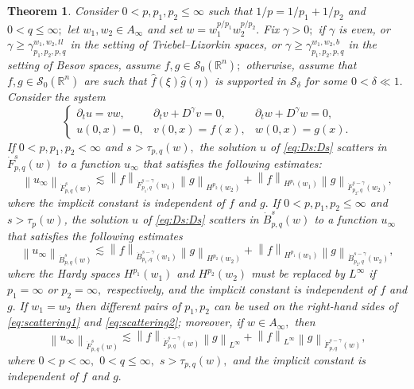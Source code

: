 \documentclass[10pt,a4paper]{article}
\newtheorem{theorem}{Theorem}[section]
\theoremstyle{remark}
\newcommand{\rn}{{{\mathbb R}^n}}
\newcommand{\swz}{{\mathcal{S}_0}(\rn)}
\newcommand{\tlw}[4]{\dot F_{#1,#3}^{#2}(#4)} %
\newcommand{\besw}[4]{\dot B_{#1,#3}^{#2}(#4)} %
\newcommand{\Ss}{\mathcal{S}}
\newcommand{\fhat}{\widehat{f}}
\newcommand{\ghat}{\widehat{g}}
\newcommand{\norm}[2]{\left\|#1\right\|_{#2}}
\newcommand{\hcline}{1/p=1/p_1+1/p_2}
\newcommand{\gamt}{\gamma_{p_1,p_2,p,q}^{w_1,w_2, tl}}
\newcommand{\gamb}{\gamma_{p_1,p_2,p,q}^{w_1,w_2,b}}
\begin{document}
 
 \begin{theorem}\label{thm:scattering} Consider  $0 < p, p_1, p_2  \le \infty$  such that $\hcline$ and  $0 < q \leq \infty;$ let  $w_1,w_2\in A_\infty$ and set $w=w_1^{{p}/{p_1}} w_2^{{p}/{p_2}}.$ 
Fix $\gamma>0;$ if $\gamma$ is even, or $\gamma\ge \gamt$ in the setting of Triebel--Lizorkin spaces, or $\gamma\ge \gamb$ in the setting of Besov spaces, assume $f, g \in \swz;$ otherwise, assume that $f,g\in\swz$ are such that $\fhat(\xi)\ghat(\eta)$ is supported in $\Ss_{\delta}$ for some $0<\delta\ll1.$ Consider the system 
\begin{equation}\label{eq:Ds:Ds}
\left\{ \begin{array}{lll}  \partial_t u =vw, & \partial_t v +D^\gamma v = 0, & \partial_t w + D^\gamma w = 0, \\
  u(0,x)=0,&v(0,x)=f(x),&w(0,x) = g(x).
 \end{array} \right.
\end{equation}
If $0 < p,p_1,p_2 < \infty$ and  $s > \tau_{p,q}(w),$ the solution $u$ of \eqref{eq:Ds:Ds}  scatters in $\tlw{p}{s}{q}{w}$ to a function $u_\infty$ that satisfies the following estimates: 
\begin{equation}\label{eq:scattering1}
\norm{u_\infty}{\tlw{p}{s}{q}{w}} \lesssim \norm{f}{\tlw{p_1}{s-\gamma}{q}{w_1} } \norm{g}{H^{p_2}(w_2)} +  \norm{f}{H^{p_1}(w_1)}   \norm{g}{\tlw{p_2}{s-\gamma}{q}{w_2} },
\end{equation}
where the implicit constant is independent of $f$ and $g.$
If $0< p, p_1,p_2\leq \infty$ and $s > \tau_p(w)$, the solution $u$ of \eqref{eq:Ds:Ds}  scatters in $\besw{p}{s}{q}{w}$ to a function $u_\infty$ that satisfies the following estimates
\begin{equation}\label{eq:scattering2}
\norm{u_\infty}{\besw{p}{s}{q}{w}} \lesssim \norm{f}{\besw{p_1}{s-\gamma}{q}{w_1} } \norm{g}{H^{p_2}(w_2)} +  \norm{f}{H^{p_1}(w_1)}   \norm{g}{\besw{p_2}{s-\gamma}{q}{w_2} },
\end{equation}
where the Hardy spaces $H^{p_1}(w_1)$ and $H^{p_2}(w_2)$ must be replaced by $L^\infty$ if $p_1=\infty$ or $p_2=\infty,$ respectively, and the implicit constant is independent of $f$ and $g.$ 
If $w_1=w_2$ then different pairs of $p_1, p_2$ can be used on the right-hand sides of \eqref{eq:scattering1} and \eqref{eq:scattering2}; moreover, if $w\in A_\infty,$ then 
\begin{equation*}
\norm{u_\infty}{\tlw{p}{s}{q}{w}} \lesssim \norm{f}{\tlw{p}{s-\gamma}{q}{w} } \norm{g}{L^\infty} +  \norm{f}{L^\infty}   \norm{g}{\tlw{p}{s-\gamma}{q}{w}},
\end{equation*}
where $0<p<\infty,$ $0<q\le\infty,$  $s>\tau_{p,q}(w),$ and the implicit constant is independent of $f$ and $g.$ 
\end{theorem} 
\end{document}
